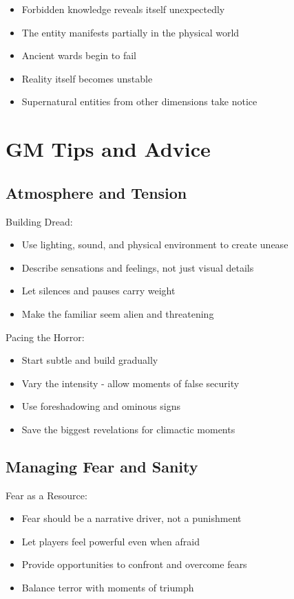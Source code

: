 \documentclass[11pt]{article}
\begin{document}
\begin{itemize}
\item Forbidden knowledge reveals itself unexpectedly
\item The entity manifests partially in the physical world
\item Ancient wards begin to fail
\item Reality itself becomes unstable
\item Supernatural entities from other dimensions take notice
\end{itemize}

\section{GM Tips and Advice}

\subsection{Atmosphere and Tension}

Building Dread:
\begin{itemize}
\item Use lighting, sound, and physical environment to create unease
\item Describe sensations and feelings, not just visual details
\item Let silences and pauses carry weight
\item Make the familiar seem alien and threatening
\end{itemize}

Pacing the Horror:
\begin{itemize}
\item Start subtle and build gradually
\item Vary the intensity - allow moments of false security
\item Use foreshadowing and ominous signs
\item Save the biggest revelations for climactic moments
\end{itemize}

\subsection{Managing Fear and Sanity}

Fear as a Resource:
\begin{itemize}
\item Fear should be a narrative driver, not a punishment
\item Let players feel powerful even when afraid
\item Provide opportunities to confront and overcome fears
\item Balance terror with moments of triumph
\end{itemize}
\end{document}

